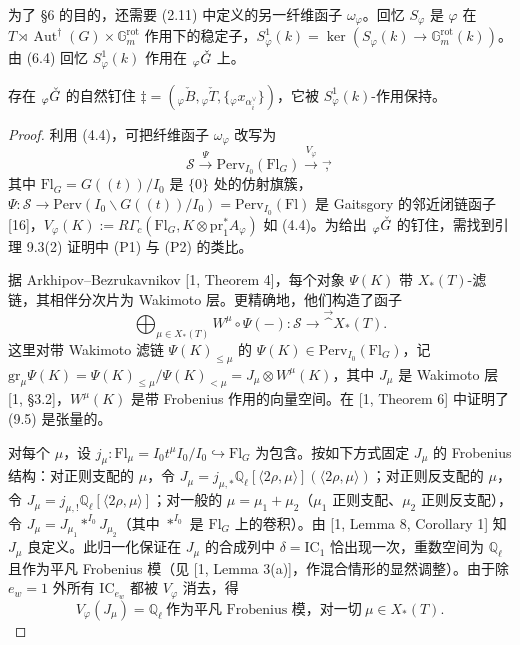 为了 §6 的目的，还需要 (2.11) 中定义的另一纤维函子 $\omega_\varphi$。回忆 $S_\varphi$ 是 $\varphi$ 在 $T\rtimes\operatorname{Aut}^\dagger(G)\times\mathbb{G}_m^{\mathrm{rot}}$ 作用下的稳定子，$S^1_\varphi(k)=\ker(S_\varphi(k)\to\mathbb{G}_m^{\mathrm{rot}}(k))$。由 (6.4) 回忆 $S^1_\varphi(k)$ 作用在 ${}_\varphi\check G$ 上。

\begin{lemma}
存在 ${}_\varphi\check G$ 的自然钉住 $\ddagger=({}_\varphi\check B,{}_\varphi\check T,\{{}_\varphi x_{\alpha_i^\vee}\})$，它被 $S^1_\varphi(k)$-作用保持。
\end{lemma}

\begin{proof}
利用 (4.4)，可把纤维函子 $\omega_\varphi$ 改写为
\[
\mathcal S\xrightarrow{\Psi}\mathrm{Perv}_{I_0}(\mathrm{Fl}_G)\xrightarrow{V_\varphi}\Vec,
\]
其中 $\mathrm{Fl}_G=G((t))/I_0$ 是 $\{0\}$ 处的仿射旗簇，$\Psi:\mathcal S\to\mathrm{Perv}(I_0\backslash G((t))/I_0)=\mathrm{Perv}_{I_0}(\mathrm{Fl})$ 是 Gaitsgory 的邻近闭链函子 [16]，$V_\varphi(K):=R\Gamma_c(\mathrm{Fl}_G,K\otimes\mathrm{pr}_1^*A_\varphi)$ 如 (4.4)。为给出 ${}_\varphi\check G$ 的钉住，需找到引理 9.3(2) 证明中 (P1) 与 (P2) 的类比。

据 Arkhipov--Bezrukavnikov [1, Theorem 4]，每个对象 $\Psi(K)$ 带 $X_*(T)$-滤链，其相伴分次片为 Wakimoto 层。更精确地，他们构造了函子
\begin{equation}
\bigoplus_{\mu\in X_*(T)}W^\mu\circ\Psi(-):\mathcal S\to\Vec^{X_*(T)}.
\end{equation}
这里对带 Wakimoto 滤链 $\Psi(K)_{\le\mu}$ 的 $\Psi(K)\in\mathrm{Perv}_{I_0}(\mathrm{Fl}_G)$，记 $\mathrm{gr}_\mu\Psi(K)=\Psi(K)_{\le\mu}/\Psi(K)_{<\mu}=J_\mu\otimes W^\mu(K)$，其中 $J_\mu$ 是 Wakimoto 层 [1, §3.2]，$W^\mu(K)$ 是带 Frobenius 作用的向量空间。在 [1, Theorem 6] 中证明了 (9.5) 是张量的。

对每个 $\mu$，设 $j_\mu:\mathrm{Fl}_\mu=I_0t^\mu I_0/I_0\hookrightarrow\mathrm{Fl}_G$ 为包含。按如下方式固定 $J_\mu$ 的 Frobenius 结构：对正则支配的 $\mu$，令 $J_\mu=j_{\mu,*}\mathbb{Q}_\ell[\langle2\rho,\mu\rangle](\langle2\rho,\mu\rangle)$；对正则反支配的 $\mu$，令 $J_\mu=j_{\mu,!}\mathbb{Q}_\ell[\langle2\rho,\mu\rangle]$；对一般的 $\mu=\mu_1+\mu_2$（$\mu_1$ 正则支配、$\mu_2$ 正则反支配），令 $J_\mu=J_{\mu_1}*^{I_0}J_{\mu_2}$（其中 $*^{I_0}$ 是 $\mathrm{Fl}_G$ 上的卷积）。由 [1, Lemma 8, Corollary 1] 知 $J_\mu$ 良定义。此归一化保证在 $J_\mu$ 的合成列中 $\delta=\mathrm{IC}_1$ 恰出现一次，重数空间为 $\mathbb{Q}_\ell$ 且作为平凡 Frobenius 模（见 [1, Lemma 3(a)]，作混合情形的显然调整）。由于除 $e_w=1$ 外所有 $\mathrm{IC}_{e_w}$ 都被 $V_\varphi$ 消去，得
\begin{equation}
V_\varphi(J_\mu)=\mathbb{Q}_\ell\ \text{作为平凡 Frobenius 模，对一切}\ \mu\in X_*(T).
\end{equation}


\end{proof}
